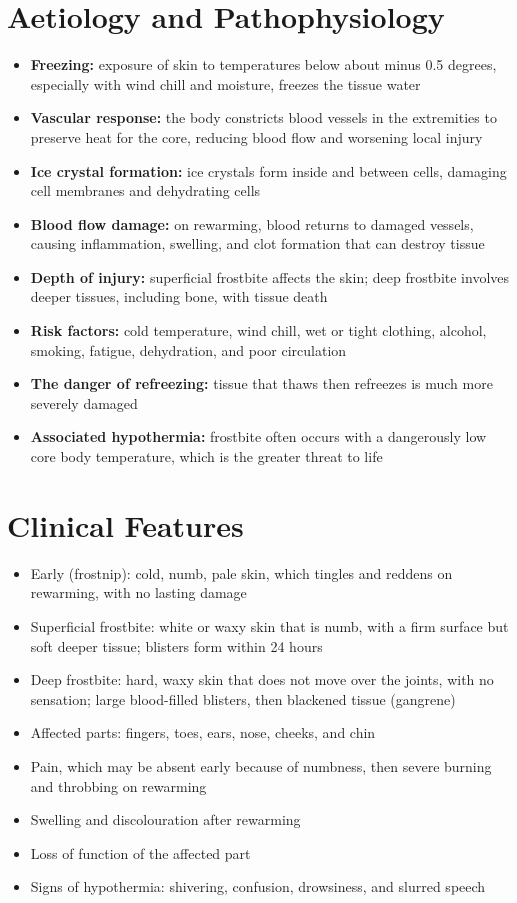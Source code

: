 \section*{Aetiology and Pathophysiology}
\begin{itemize}
    \item \textbf{Freezing:} exposure of skin to temperatures below about minus 0.5 degrees, especially with wind chill and moisture, freezes the tissue water
    \item \textbf{Vascular response:} the body constricts blood vessels in the extremities to preserve heat for the core, reducing blood flow and worsening local injury
    \item \textbf{Ice crystal formation:} ice crystals form inside and between cells, damaging cell membranes and dehydrating cells
    \item \textbf{Blood flow damage:} on rewarming, blood returns to damaged vessels, causing inflammation, swelling, and clot formation that can destroy tissue
    \item \textbf{Depth of injury:} superficial frostbite affects the skin; deep frostbite involves deeper tissues, including bone, with tissue death
    \item \textbf{Risk factors:} cold temperature, wind chill, wet or tight clothing, alcohol, smoking, fatigue, dehydration, and poor circulation
    \item \textbf{The danger of refreezing:} tissue that thaws then refreezes is much more severely damaged
    \item \textbf{Associated hypothermia:} frostbite often occurs with a dangerously low core body temperature, which is the greater threat to life
\end{itemize}

\section*{Clinical Features}
\begin{itemize}
    \item Early (frostnip): cold, numb, pale skin, which tingles and reddens on rewarming, with no lasting damage
    \item Superficial frostbite: white or waxy skin that is numb, with a firm surface but soft deeper tissue; blisters form within 24 hours
    \item Deep frostbite: hard, waxy skin that does not move over the joints, with no sensation; large blood-filled blisters, then blackened tissue (gangrene)
    \item Affected parts: fingers, toes, ears, nose, cheeks, and chin
    \item Pain, which may be absent early because of numbness, then severe burning and throbbing on rewarming
    \item Swelling and discolouration after rewarming
    \item Loss of function of the affected part
    \item Signs of hypothermia: shivering, confusion, drowsiness, and slurred speech
\end{itemize}

